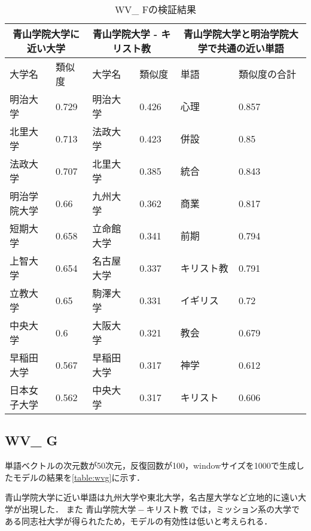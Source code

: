 \begin{table}[H]
\caption{WV\_ Fの検証結果}
\centering
\footnotesize
\begin{tabular}{ll|ll|ll}
\hline
\multicolumn{2}{c}{青山学院大学に近い大学} & \multicolumn{2}{c}{青山学院大学 - キリスト教} & \multicolumn{2}{c}{青山学院大学と明治学院大学で共通の近い単語}
\\ \hline
大学名 & 類似度 & 大学名 & 類似度 & 単語 & 類似度の合計
\\ \hline \hline
明治大学 & 0.729 & 明治大学 & 0.426 & 心理 & 0.857\\
北里大学 & 0.713 & 法政大学 & 0.423 & 併設 & 0.85\\
法政大学 & 0.707 & 北里大学 & 0.385 & 統合 & 0.843\\
明治学院大学 & 0.66 & 九州大学 & 0.362 & 商業 & 0.817\\
短期大学 & 0.658 & 立命館大学 & 0.341 & 前期 & 0.794\\
上智大学 & 0.654 & 名古屋大学 & 0.337 & キリスト教 & 0.791\\
立教大学 & 0.65 & 駒澤大学 & 0.331 & イギリス & 0.72\\
中央大学 & 0.6 & 大阪大学 & 0.321 & 教会 & 0.679\\
早稲田大学 & 0.567 & 早稲田大学 & 0.317 & 神学 & 0.612\\
日本女子大学 & 0.562 & 中央大学 & 0.317 & キリスト & 0.606\\ \hline
\end{tabular}
\label{table:wvf}
\end{table}


\subsection{WV\_ G}
単語ベクトルの次元数が50次元，反復回数が100，windowサイズを1000で生成したモデルの結果を\ref{table:wvg}に示す．

青山学院大学に近い単語は九州大学や東北大学，名古屋大学など立地的に遠い大学が出現した．
また $ 青山学院大学 - キリスト教 $ では，ミッション系の大学である同志社大学が得られたため，モデルの有効性は低いと考えられる．

